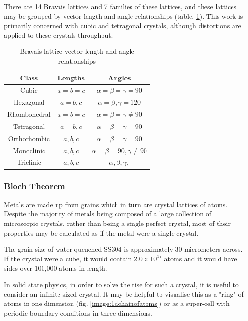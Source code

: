 There are 14 Bravais lattices and 7 families of these lattices, and these lattices may be grouped by vector length and angle relationships (table. \ref{table:bravaisvectors}).  This work is primarily concerned with cubic and tetragonal crystals, although distortions are applied to these crystals throughout.

\begin{table}[h]
\begin{center}
\renewcommand{\arraystretch}{1.2}
\begin{tabular}{c c c}
\hline\hline
Class & Lengths & Angles \\
\hline\hline
Cubic & $a = b = c$ & $ \alpha = \beta = \gamma = 90 $ \\
Hexagonal & $a = b, c $ & $ \alpha = \beta, \gamma = 120 $ \\
Rhombohedral & $a = b = c $ & $ \alpha = \beta = \gamma \neq 90 $ \\
Tetragonal & $a = b, c $ & $ \alpha = \beta = \gamma = 90 $ \\
Orthorhombic & $a, b, c $ & $ \alpha = \beta = \gamma = 90 $ \\
Monoclinic & $a, b, c $ & $ \alpha = \beta = 90, \gamma \neq 90 $ \\
Triclinic & $a, b, c $ & $ \alpha, \beta, \gamma, $ \\
\hline
\end{tabular}
\caption{Bravais lattice vector length and angle relationships}
\label{table:bravaisvectors}
\end{center}
\end{table}



\subsubsection{Bloch Theorem}
\label{section:blochtheorem}

Metals are made up from grains which in turn are crystal lattices of atoms.  Despite the majority of metals being composed of a large collection of microscopic crystals, rather than being a single perfect crystal, most of their properties may be calculated as if the metal were a single crystal.

The grain size of water quenched SS304 is approximately 30 micrometers across\cite{grainsizesteel}.  If the crystal were a cube, it would contain $2.0 \times 10^{15}$ atoms and it would have sides over 100,000 atoms in length.

In solid state physics, in order to solve the \acrshort{tise} for such a crystal, it is useful to consider an infinite sized crystal.  It may be helpful to visualise this as a "ring" of atoms in one dimension (fig. \ref{image:1dchainofatoms}) or as a super-cell with periodic boundary conditions in three dimensions.


